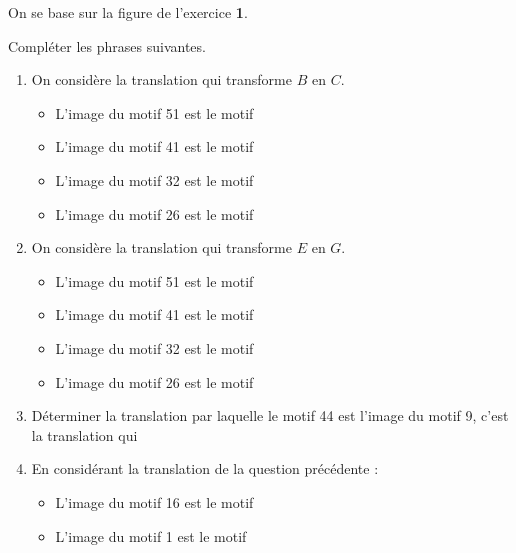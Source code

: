 \begin{exercice*}
    On se base sur la figure de l'exercice {\bfseries 1}.
    
    \Reseau[%
    Colonnes=5,%
    Lignes=8,%
    Traces={%
        pair A,B,C,D,E,F,G,H; %
        A=ppreseau(0,8);
        B=ppreseau(1,8);
        C=ppreseau(1,7);
        D=ppreseau(0,7);
        E=ppreseau(2,5);
        F=ppreseau(1,2);
        G=ppreseau(3,2);
        H=ppreseau(4,6);
        marque_p:="croix";
        drawoptions(withcolor red);
        pointe(A,B,C,D,E,F,G,H);
        label.urt(btex $A$ etex,A);
        label.urt(btex $B$ etex,B);
        label.urt(btex $C$ etex,C);
        label.urt(btex $D$ etex,D);
        label.urt(btex $E$ etex,E);
        label.urt(btex $F$ etex,F);
        label.urt(btex $G$ etex,G);
        label.urt(btex $H$ etex,H);
        drawoptions();
    }]{}

    Compléter les phrases suivantes.
    \begin{enumerate}
        \item On considère la translation qui transforme $B$ en $C$.
        \begin{itemize}
            \item L'image du motif \num{51} est le motif \pointilles
            \item L'image du motif \num{41} est le motif \pointilles
            \item L'image du motif \num{32} est le motif \pointilles
            \item L'image du motif \num{26} est le motif \pointilles
        \end{itemize}
        \item On considère la translation qui transforme $E$ en $G$.
        \begin{itemize}
            \item L'image du motif \num{51} est le motif \pointilles
            \item L'image du motif \num{41} est le motif \pointilles
            \item L'image du motif \num{32} est le motif \pointilles
            \item L'image du motif \num{26} est le motif \pointilles
        \end{itemize}
        \item Déterminer la translation par laquelle le motif \num{44} est l'image du motif \num{9}, c'est la translation qui 
        
        \pointilles
        \item En considérant la translation de la question précédente :
        \begin{itemize}
            \item L'image du motif \num{16} est le motif \pointilles
            \item L'image du motif \num{1} est le motif \pointilles
        \end{itemize}
    \end{enumerate}
\end{exercice*}
